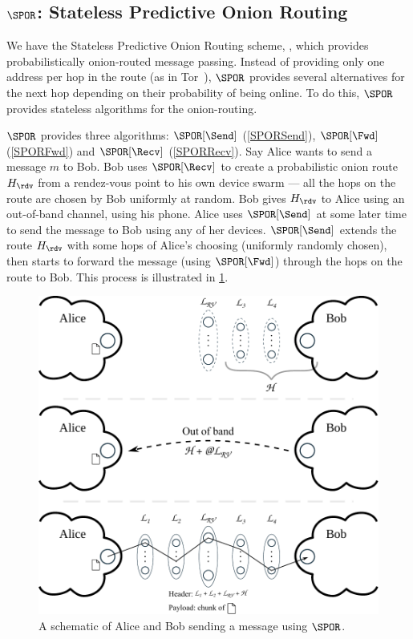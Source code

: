 
\subsection{\(\SPOR\): Stateless Predictive Onion Routing}%
\label{SPOR}


We have the Stateless Predictive Onion Routing scheme, \SPOR, which provides 
probabilistically onion-routed message passing.
Instead of providing only one address per hop in the route (as in \eg 
Tor~\cite{Tor}), \(\SPOR\) provides several alternatives for the next hop 
depending on their probability of being online.
To do this, \(\SPOR\) provides stateless algorithms for the onion-routing.

\(\SPOR\) provides three algorithms: \(\SPOR[\Send]\) (\cref{SPORSend}), 
\(\SPOR[\Fwd]\) (\cref{SPORFwd}) and \(\SPOR[\Recv]\) (\cref{SPORRecv}).
Say Alice wants to send a message \(m\) to Bob.
Bob uses \(\SPOR[\Recv]\) to create a probabilistic onion route \(H_\rdv\) from 
a rendez-vous point to his own device swarm --- all the hops on the route are 
chosen by Bob uniformly at random.
Bob gives \(H_\rdv\) to Alice using an out-of-band channel, \eg using his phone.
Alice uses \(\SPOR[\Send]\) at some later time to send the message to Bob using 
any of her devices.
\(\SPOR[\Send]\) extends the route \(H_\rdv\) with some hops of Alice's choosing 
(uniformly randomly chosen), then starts to forward the message (using 
\(\SPOR[\Fwd]\)) through the hops on the route to Bob.
This process is illustrated in \cref{fig:file-exchange}.

\begin{figure}
  \includegraphics[width=\linewidth]{figures/file_exchange.pdf}
  \caption{\label{fig:file-exchange}%
    A schematic of Alice and Bob sending a message using \(\SPOR\).
  }
\end{figure}

